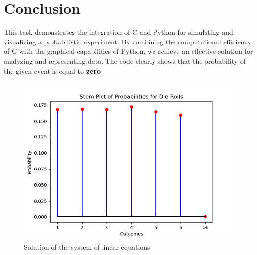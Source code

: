 \documentclass[journal]{IEEEtran}
\begin{document}
\section*{Conclusion}
This task demonstrates the integration of C and Python for simulating and visualizing a probabilistic experiment. By combining the computational efficiency of C with the graphical capabilities of Python, we achieve an effective solution for analyzing and representing data. The code clearly shows that the probability of the given event is equal to \textbf{zero}

	\begin{figure}[h!]
		\centering
		\includegraphics[width=\columnwidth]{figs/fig1.png}
		\caption{Solution of the system of linear equations}
		\label{stemplot}
	\end{figure}
	
\end{document}
